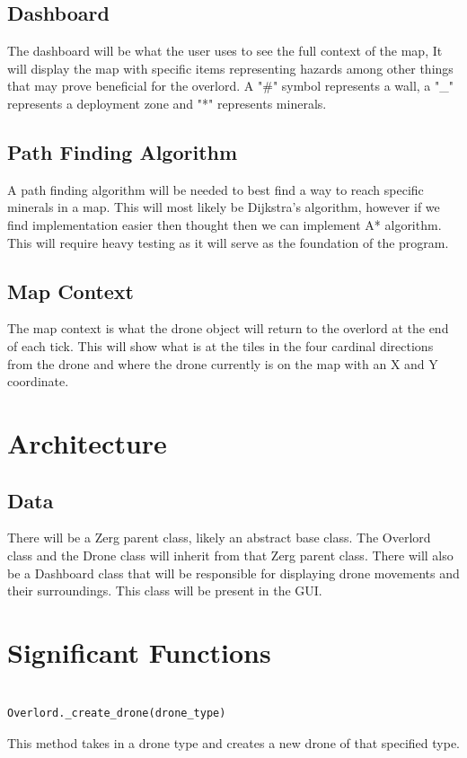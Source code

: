 \documentclass[12pt]{article}
\begin{document}
\subsection{Dashboard}
The dashboard will be what the user uses to see the full context of the map, It will display the map with specific items representing hazards among other things that may prove beneficial for the overlord. A "\#" symbol represents a wall, a "\_" represents a deployment zone and "*" represents minerals.
\subsection{Path Finding Algorithm}
A path finding algorithm will be needed to best find a way to reach specific minerals in a map. This will most likely be Dijkstra's algorithm, however if we find implementation easier then thought then we can implement A* algorithm. This will require heavy testing as it will serve as the foundation of the program.
\subsection{Map Context}
The map context is what the drone object will return to the overlord at the end of each tick. This will show what is at the tiles in the four cardinal directions from the drone and where the drone currently is on the map with an X and Y coordinate.
\newpage
\section{Architecture}
\subsection{Data}
There will be a Zerg parent class, likely an abstract base class. The Overlord class and the Drone class will inherit from that Zerg parent class. There will also be a Dashboard class that will be responsible for displaying drone movements and their surroundings. This class will be present in the GUI.
\section{Significant Functions}

\begin{lstlisting}[basicstyle=\large]

Overlord._create_drone(drone_type)
\end{lstlisting}
\large{This method takes in a drone type and creates a new drone of that specified type.}\\
\end{document}
